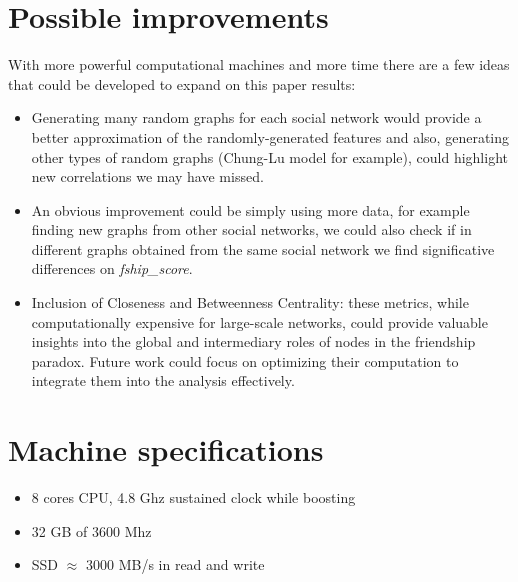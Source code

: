 \documentclass{article}
\begin{document}
\section{Possible improvements}
With more powerful computational machines and more time there are a few ideas that could be developed to expand on this paper results:
\begin{itemize}
    \item Generating many random graphs for each social network would provide a better approximation of the randomly-generated features and also, generating other types of random graphs (Chung-Lu model for example), could highlight new correlations we may have missed.
    \item An obvious improvement could be simply using more data, for example finding new graphs from other social networks, we could also check if in different graphs obtained from the same social network we find significative differences on \textit{fship\_score}.
    \item Inclusion of Closeness and Betweenness Centrality: these metrics, while computationally expensive for large-scale networks, could provide valuable insights into the global and intermediary roles of nodes in the friendship paradox. Future work could focus on optimizing their computation to integrate them into the analysis effectively.
\end{itemize}

\section{Machine specifications}
\begin{itemize}
    \item 8 cores CPU, 4.8 Ghz sustained clock while boosting
    \item 32 GB of 3600 Mhz 
    \item SSD $\approx$ 3000 MB/s in read and write
\end{itemize}
\end{document}
